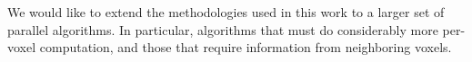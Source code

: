 We would like to extend the methodologies used in this work to a larger
set of parallel algorithms.  In particular, algorithms that must
do considerably more per-voxel computation, and those that require
information from neighboring voxels.

%
%
%
%
%
%
%
%
%
